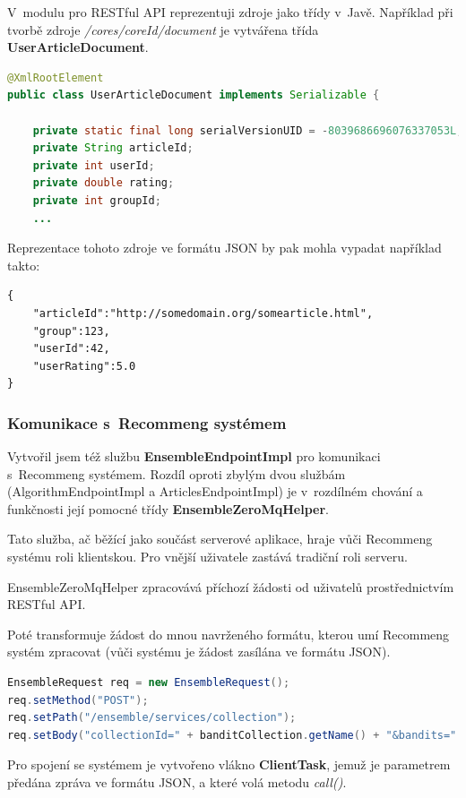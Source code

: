 \documentclass[thesis=M,czech]{FITthesis}[2014/05/07]
\begin{document}
V~modulu pro RESTful API reprezentuji zdroje jako třídy v~Javě. Například při tvorbě zdroje \emph{/cores/{coreId}/document} je vytvářena třída \textbf{UserArticleDocument}. 

\begin{lstlisting}[language=java]
@XmlRootElement
public class UserArticleDocument implements Serializable {       
    
    private static final long serialVersionUID = -8039686696076337053L;    
    private String articleId;
    private int userId;    
    private double rating;
    private int groupId;
    ...
\end{lstlisting}

Reprezentace tohoto zdroje ve formátu JSON by pak mohla vypadat například takto:

\begin{lstlisting}
{
    "articleId":"http://somedomain.org/somearticle.html",
    "group":123,
    "userId":42,
    "userRating":5.0
}
\end{lstlisting}

\subsubsection{Komunikace s~Recommeng systémem}
\label{sec:restrec}
Vytvořil jsem též službu \textbf{EnsembleEndpointImpl} pro komunikaci s~Recommeng systémem. Rozdíl oproti zbylým dvou službám (AlgorithmEndpointImpl a ArticlesEndpointImpl) je v~rozdílném chování a funkčnosti její pomocné třídy \textbf{EnsembleZeroMqHelper}.

Tato služba, ač běžící jako součást serverové aplikace, hraje vůči Recommeng systému roli klientskou. Pro vnější uživatele zastává tradiční roli serveru.

EnsembleZeroMqHelper zpracovává příchozí žádosti od uživatelů prostřednictvím RESTful API.

Poté transformuje žádost do mnou navrženého formátu, kterou umí Recommeng systém zpracovat (vůči systému je žádost zasílána ve formátu JSON). 

\begin{lstlisting}[language=java]
EnsembleRequest req = new EnsembleRequest();
req.setMethod("POST");
req.setPath("/ensemble/services/collection");
req.setBody("collectionId=" + banditCollection.getName() + "&bandits=" + formatBanditIds(banditCollection.getBanditIds()));
\end{lstlisting}

Pro spojení se systémem je vytvořeno vlákno \textbf{ClientTask}, jemuž je parametrem předána zpráva ve formátu JSON, a které volá metodu \emph{call()}.
\end{document}
